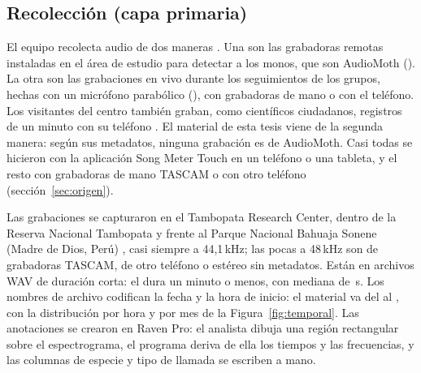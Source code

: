 \subsection{Recolección (capa primaria)}
\label{sec:recoleccion}

El equipo recolecta audio de dos maneras \citep{wiredamazon_8primates}. Una son
las grabadoras remotas instaladas en el área de estudio para detectar a los monos,
que son AudioMoth (\cpEquipo). La otra son las grabaciones en vivo durante los
seguimientos de los grupos, hechas con un micrófono parabólico (\cpEquipo), con
grabadoras de mano o con el teléfono. Los visitantes del centro también graban,
como científicos ciudadanos, registros de un minuto con su teléfono
\citep{rfe_8primates}. El material de esta tesis viene de la segunda manera:
según sus metadatos, ninguna grabación es de AudioMoth. Casi todas se hicieron con
la aplicación Song Meter Touch en un teléfono o una tableta, y el resto con
grabadoras de mano TASCAM o con otro teléfono (sección~\ref{sec:origen}).

Las grabaciones se capturaron en el Tambopata Research Center, dentro de la
Reserva Nacional Tambopata y frente al Parque Nacional Bahuaja Sonene (Madre de
Dios, Perú) \citep{rfe_trc}, casi siempre a 44,1\,kHz; las pocas a 48\,kHz son de
grabadoras TASCAM, de otro teléfono o estéreo sin metadatos. Están en archivos
WAV de duración corta: el
\pctShortRecordings{} dura un minuto o menos, con mediana de
\medianRecordingS{}\,s. Los nombres de archivo codifican la fecha y la hora de
inicio: el material va del \firstDate{} al \lastDate{}, con la distribución por
hora y por mes de la Figura~\ref{fig:temporal}. Las anotaciones se crearon en
Raven Pro: el analista dibuja una región rectangular sobre el espectrograma, el
programa deriva de ella los tiempos y las frecuencias, y las columnas de especie y
tipo de llamada se escriben a mano.

